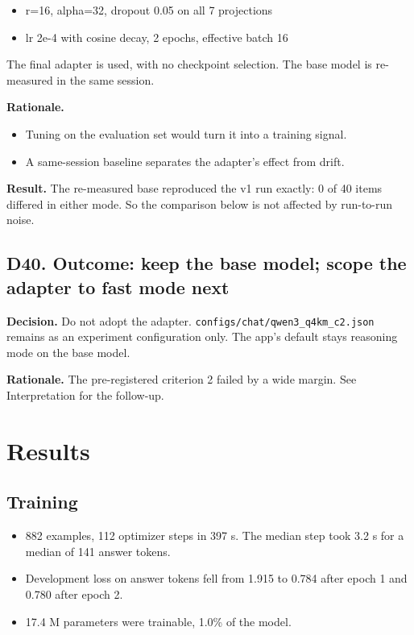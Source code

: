 \documentclass[11pt,a4paper]{article}
\newcommand{\code}[1]{\texttt{#1}}
\begin{document}
\begin{itemize}
\item r=16, alpha=32, dropout 0.05 on all 7 projections
\item lr 2e-4 with cosine decay, 2 epochs, effective batch 16
\end{itemize}

The final adapter is used, with no checkpoint selection. The base model is re-measured in the same session.

\textbf{Rationale.}

\begin{itemize}
\item Tuning on the evaluation set would turn it into a training signal.
\item A same-session baseline separates the adapter's effect from drift.
\end{itemize}

\textbf{Result.} The re-measured base reproduced the v1 run exactly: 0 of 40 items differed in either mode. So the comparison below is not affected by run-to-run noise.

\subsection{D40. Outcome: keep the base model; scope the adapter to fast mode next}

\textbf{Decision.} Do not adopt the adapter. \code{configs/chat/qwen3\_q4km\_c2.json} remains as an experiment configuration only. The app's default stays reasoning mode on the base model.

\textbf{Rationale.} The pre-registered criterion 2 failed by a wide margin. See Interpretation for the follow-up.

\section{Results}

\subsection{Training}

\begin{itemize}
\item 882 examples, 112 optimizer steps in 397 s. The median step took 3.2 s for a median of 141 answer tokens.
\item Development loss on answer tokens fell from 1.915 to 0.784 after epoch 1 and 0.780 after epoch 2.
\item 17.4 M parameters were trainable, 1.0\% of the model.
\end{itemize}
\end{document}
